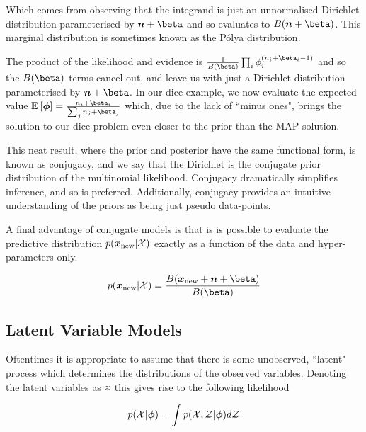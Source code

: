 Which comes from observing that the integrand is just an unnormalised Dirichlet distribution parameterised by $\vv{n} + \vv{\beta}$ and so evaluates to $B(\vv{n} + \vv{\beta})$. This marginal distribution is sometimes known as the P\'{o}lya distribution. 

The product of the likelihood and evidence is $\frac{1}{B(\vv{\beta})} \prod_i \phi_i^{(n_i + \beta_i - 1)}$ and so the $B(\vv{\beta})$ terms cancel out, and leave us with just a Dirichlet distribution parameterised by $\vv{n} + \vv{\beta}$. In our dice example, we now evaluate the expected value $\ex{\param}{} = \frac{n_i + \beta_i}{\sum_j n_j + \beta_j}$ which, due to the lack of ``minus ones", brings the solution to our dice problem even closer to the prior than the MAP solution.

This neat result, where the prior and posterior have the same functional form, is known as conjugacy, and we say that the Dirichlet is the conjugate prior distribution of the multinomial likelihood. Conjugacy dramatically simplifies inference, and so is preferred. Additionally, conjugacy provides an intuitive understanding of the priors as being just pseudo data-points.

A final advantage of conjugate models is that is is possible to evaluate the predictive distribution $p({ \bm x_{\text{new}} } | { \mathcal{X} })$ exactly as a function of the data and hyper-parameters only.

\begin{align*}
p(\xnew | \xdat) = \frac{B(\xnew + \vv{n} + \vv{\beta})}{B(\vv{\beta})}
\end{align*}
 
\subsection{Latent Variable Models}
Oftentimes it is appropriate to assume that there is some unobserved, ``latent" process which determines the distributions of the observed variables. Denoting the latent variables as $\bm z$ this gives rise to the following likelihood

\begin{align*}
p({ \mathcal{X} }|{ \bm \phi }) = \int p({ \mathcal{X} }, { \mathcal{Z} }|{ \bm \phi }) d{ \mathcal{Z} }
\end{align*}

